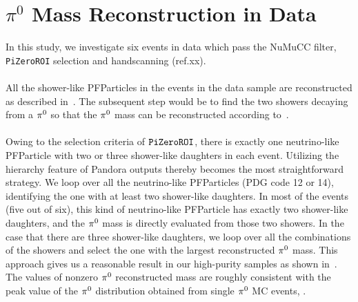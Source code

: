 \section{$\pi^{0}$ Mass Reconstruction in Data}
\label{sec:data_pi0}

In this study, we investigate six events in data which pass
the NuMuCC filter, \texttt{PiZeroROI} selection and 
handscanning (ref.xx).\\
\\
All the shower-like PFParticles in the events in the data sample
are reconstructed as described in~.
The subsequent step would be to find the two showers decaying from a 
${\pi}^0$ so that the ${\pi}^0$ mass can be reconstructed according
to~. \\
\\
Owing to the selection criteria of $\texttt{PiZeroROI}$, there is exactly one
neutrino-like PFParticle with two or three shower-like daughters in
each event.
Utilizing the hierarchy feature of Pandora outputs thereby becomes
the most straightforward strategy.
We loop over all the neutrino-like PFParticles (PDG code 12 or 14), 
identifying the one with at least two shower-like daughters.
In most of the events (five out of six), this kind of neutrino-like 
PFParticle has exactly two 
shower-like daughters, and the ${\pi}^0$ mass is directly evaluated
from those two showers.
In the case that there are three shower-like daughters, we loop over
all the combinations of the showers and select the one with the largest
reconstructed ${\pi}^0$ mass.
This approach gives us a reasonable result in our high-purity samples
as shown in~.
The values of nonzero ${\pi}^0$ reconstructed mass are roughly
consistent with the peak value of the ${\pi}^0$ distribution obtained
from single ${\pi}^0$ MC events, .\\
\\
